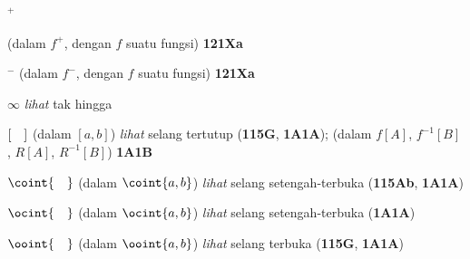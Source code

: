 $^+$
  
  
  (dalam $f^+$, dengan $f$ suatu fungsi) {\bf 121Xa}
  
  
  


$^-$ (dalam $f^-$, dengan $f$ suatu fungsi) {\bf 121Xa}






















































$\infty$ {\it lihat} tak hingga





$[\hskip1em]$ (dalam $[a,b]$) {\it lihat} selang tertutup ({\bf 115G},
{\bf 1A1A});
  (dalam $f[A]$, $f^{-1}[B]$, $R[A]$, $R^{-1}[B]$) {\bf 1A1B}





$\coint{\hskip1em}$ (dalam $\coint{a,b}$) {\it lihat} selang setengah-terbuka
({\bf 115Ab}, {\bf 1A1A})

$\ocint{\hskip1em}$ (dalam $\ocint{a,b}$) {\it lihat} selang setengah-terbuka
({\bf 1A1A})

$\ooint{\hskip1em}$ (dalam $\ooint{a,b}$) {\it lihat} selang terbuka
({\bf 115G}, {\bf 1A1A})

















\frnewpage

